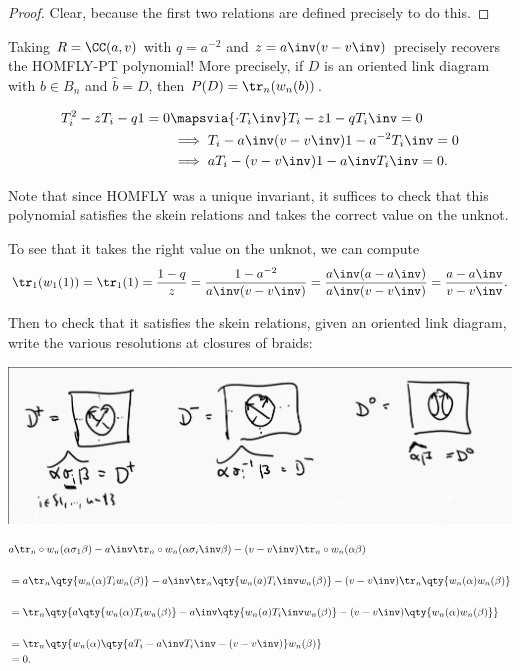 \begin{proof}

Clear, because the first two relations are defined precisely to do this.

\end{proof}

\begin{remark}

Taking \(R = \CC(a, v)\) with \(q = a^{-2}\) and
\(z = a\inv(v - v\inv)\) precisely recovers the HOMFLY-PT polynomial!
More precisely, if \(D\) is an oriented link diagram with \(b\in B_n\)
and \(\hat b = D\), then \(P(D) = \tr_n(w_n(b))\).

\begin{align*}
T_i^2 - zT_i -q1= 0 
&\mapsvia{\cdot T_i\inv} T_i -z1 - qT_i\inv = 0 \\
&\implies T_i - a\inv(v-v\inv)1 - a^{-2} T_i\inv = 0 \\
&\implies aT_i - (v-v\inv)1 - a\inv T_i\inv = 0
.\end{align*}

Note that since HOMFLY was a unique invariant, it suffices to check that
this polynomial satisfies the skein relations and takes the correct
value on the unknot.

To see that it takes the right value on the unknot, we can compute
\begin{align*}
\tr_1(w_1(1)) = \tr_1(1) = {1-q \over z} = {1 - a^{-2} \over a\inv(v - v\inv)} = {a\inv(a - a\inv) \over a\inv(v - v\inv)} = {a-a\inv \over v-v\inv}
.\end{align*}

Then to check that it satisfies the skein relations, given an oriented
link diagram, write the various resolutions at closures of braids:

\includegraphics{figures/image_2020-07-10-11-40-29.png}

\begin{align*}
&a \tr_n \circ w_n(\alpha \sigma_1 \beta)- a\inv \tr_n \circ w_n (\alpha \sigma_i\inv \beta) - (v-v\inv) \tr_n \circ w_n(\alpha \beta) \\ \\
&= a \tr_n \qty{ w_n(\alpha) T_i w_n(\beta)} - a\inv \tr_n \qty{ w_n(a) T_i\inv w_n(\beta)} - (v-v\inv) \tr_n\qty{ w_n(\alpha) w_n(\beta)} \\ \\
&= \tr_n \qty{ a \qty{ w_n(\alpha) T_i w_n(\beta)} - a\inv \qty{ w_n(a) T_i\inv w_n(\beta)} - (v-v\inv) \qty{ w_n(\alpha) w_n(\beta)}} \\ \\
&= \tr_n\qty{ w_n(\alpha) \qty{ aT_i - a\inv T_i\inv - (v-v\inv)  }w_n(\beta) } \\ 
&= 0
.\end{align*}


\end{remark}
